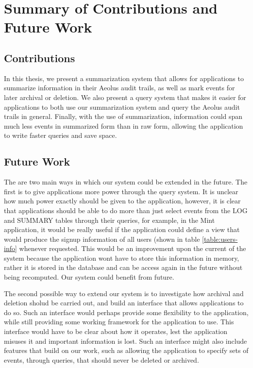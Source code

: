 \chapter{Summary of Contributions and Future Work}

\section{Contributions}

In this thesis, we present a summarization system that allows for applications to summarize information in their Aeolus audit trails, as well as mark events for later archival or deletion. We also present a query system that makes it easier for applications to both use our summarization system and query the Aeolus audit trails in general. Finally, with the use of summarization, information could span much less events in summarized form than in raw form, allowing the application to write faster queries and save space.

\section{Future Work}

The are two main ways in which our system could be extended in the future. The first is to give applications more power through the query system. It is unclear how much power exactly should be given to the application, however, it is clear that applications should be able to do more than just select events from the LOG and SUMMARY tables through their queries, for example, in the Mint application, it would be really useful if the application could define a view that would produce the signup information of all users (shown in table \ref{table:users-info} whenever requested. This would be an improvement upon the current of the system because the application wont have to store this information in memory, rather it is stored in the database and can be access again in the future without being recomputed. Our system could benefit from future.

The second possible way to extend our system is to investigate how archival and deletion sholud be carried out, and build an interface that allows applications to do so. Such an interface would perhaps provide some flexibility to the application, while still providing some working framework for the application to use. This interface would have to be clear about how it operates, lest the application misuses it and important information is lost. Such an interface might also include features that build on our work, such as allowing the application to specify sets of events, through queries, that should never be deleted or archived.
